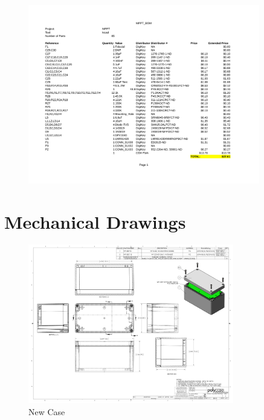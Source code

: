 \documentclass{article}
\numberwithin{figure}{section}
\numberwithin{equation}{section}
\begin{document}
{\begin{figure}[H]
	\includegraphics[page=1,width=0.9\textwidth]{MPPT_BOM.pdf}
	\caption{}
	\label{fig:mpptbom1}
\end{figure}


\newpage
\section{Mechanical Drawings} \label{sect:appendixC}
\begin{figure}[H]
	\centering
	\includegraphics[width=0.8\textwidth]{NewCase.pdf}
	\caption{New Case}
	\label{fig:append_new_case}
\end{figure}

}
\end{document}

